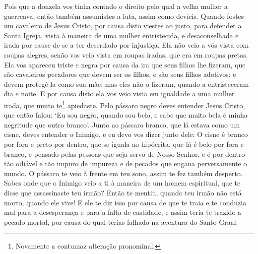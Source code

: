 Pois que a donzela vos tinha contado o direito pelo qual a velha mulher a
guerreava, então também assumistes a luta, assim como devíeis. Quando fostes um
cavaleiro de Jesus Cristo, por causa disto viestes ao justo, para defender a
Santa Igreja, vista à maneira de uma mulher entristecida, e desaconselhada e
irada por cause de se a ter deserdado por injustiça. Ela não veio a vós vista
com roupas alegres, senão vos veio vista em roupas iradas, que era em roupas
pretas. Ela vos apareceu triste e negra por causa da ira que seus filhos lhe
fizeram, que são cavaleiros pecadores que devem ser os filhos, e são seus
filhos adotivos; e devem protegê-la como sua mãe; mas eles não o fizeram,
quando a entristeceram dia e noite. E por causa disto ela vos veio
vista em igualdade a uma mulher irada, que muito te\footnote{ Novamente a
contumaz alteração pronominal. } apiedaste. Pelo pássaro negro deves
entender Jesus Cristo, que então falou: ‘Eu sou negro, quando sou belo, e sabe
que muito bela é minha negritude que outro branco’. Junto ao pássaro branco,
que lá estava como um cisne, deves entender o Inimigo, e eu devo vos dizer
junto dele: O cisne é branco por fora e preto por dentro, que se iguala ao
hipócrita, que lá é belo por fora e branco, e pensado pelas pessoas que seja
servo de Nosso Senhor, e é por dentro tão odiável e tão impuro  de impureza e
de pecados que engana perversamente o mundo. O pássaro te veio à frente em teu
sono, assim te fez também desperto. Sabes onde que o Inimigo veio a ti à
maneira de um homem espiritual, que te disse que assassinaste teu irmão? Então
te mentiu, quando teu irmão não está morto, quando ele vive! E ele te diz isso
por causa de que te traia e te conduzia mal para a desesperança e para a falta
de castidade, e assim teria te trazido a pecado mortal, por causa do qual
terias falhado na aventura do Santo Graal.  

